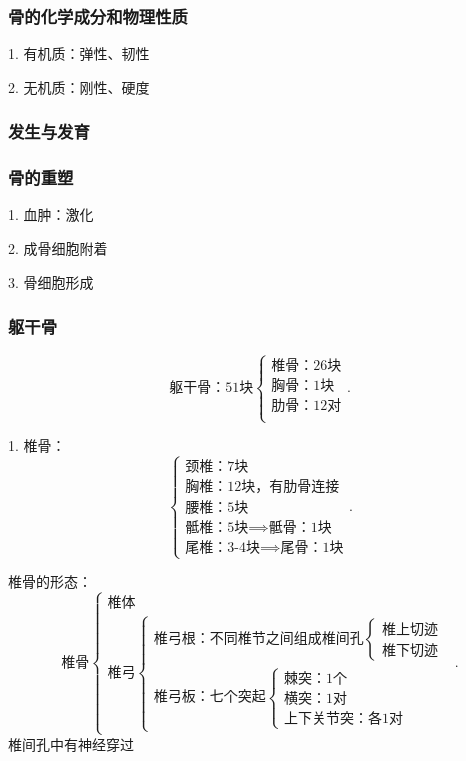 \subsubsection*{骨的化学成分和物理性质}%
\label{subsub:骨的化学成分和物理性质}
1. 有机质：弹性、韧性

2. 无机质：刚性、硬度

\subsubsection*{发生与发育}%
\label{subsub:发生与发育}

\subsubsection*{骨的重塑}%
\label{subsub:骨的重塑}
1. 血肿：激化

2. 成骨细胞附着

3. 骨细胞形成
\subsubsection{躯干骨}%
\label{subsub:躯干骨}
\[
    \text{躯干骨：51块}
    \begin{cases}
        \text{椎骨：26块}\\ 
        \text{胸骨：1块}\\ 
        \text{肋骨：12对}\\ 
    \end{cases}
.\] 

1. 椎骨：
\[
    \begin{cases}
        \text{颈椎：7块}\\ 
        \text{胸椎：12块，有肋骨连接}\\ 
        \text{腰椎：5块}\\ 
        \text{骶椎：5块}\implies \text{骶骨：1块}\\
        \text{尾椎：3-4块}\implies \text{尾骨：1块}
    \end{cases}
.\] 

\begin{notation}
    椎骨的形态：
    \[
        \text{椎骨}
        \begin{cases}
            \text{椎体}\\ 
            \text{椎弓}
            \begin{cases}
                \text{椎弓根：不同椎节之间组成椎间孔}
                \begin{cases}
                    \text{椎上切迹}\\ 
                    \text{椎下切迹}
                \end{cases}\\
                \text{椎弓板：七个突起}
                \begin{cases}
                    \text{棘突：1个}\\ 
                    \text{横突：1对}\\ 
                    \text{上下关节突：各1对}
                \end{cases}
            \end{cases}
        \end{cases}
    .\] 
    椎间孔中有神经穿过
\end{notation}

